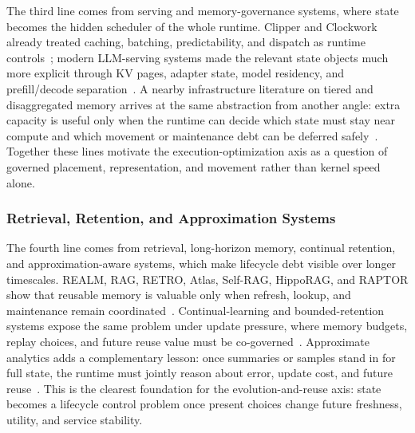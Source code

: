 \documentclass[acmsmall,screen,review]{acmart}
\begin{document}
The third line comes from serving and memory-governance systems, where state becomes the hidden scheduler of the whole runtime. Clipper and Clockwork already treated caching, batching, predictability, and dispatch as runtime controls~\cite{crankshaw2017clipper,gujarati2020clockwork}; modern LLM-serving systems made the relevant state objects much more explicit through KV pages, adapter state, model residency, and prefill/decode separation~\cite{shen2019nexus,crankshaw2020inferline,romero2021infaas,yu2022orca,sheng2023flexgen,li2023alpaserve,chen2024punica,kwon2023pagedattention,sheng2023slora,zheng2023sglang,agrawal2024sarathi,zhong2024distserve,patel2024splitwise,holmes2024fastgen,yu2025prism,zhang2025jenga}. A nearby infrastructure literature on tiered and disaggregated memory arrives at the same abstraction from another angle: extra capacity is useful only when the runtime can decide which state must stay near compute and which movement or maintenance debt can be deferred safely~\cite{hu2024aceso,zhong2024unimem,jalalian2024extmem,raybuck2021hemem,cho2024coaxial,zhao2025equilibria,peng2024scalacache,wang2025finemem,chang2024gmt,li2024streamcache,qiu2025hotrap}. Together these lines motivate the execution-optimization axis as a question of governed placement, representation, and movement rather than kernel speed alone.

\subsubsection{Retrieval, Retention, and Approximation Systems}

The fourth line comes from retrieval, long-horizon memory, continual retention, and approximation-aware systems, which make lifecycle debt visible over longer timescales. REALM, RAG, RETRO, Atlas, Self-RAG, HippoRAG, and RAPTOR show that reusable memory is valuable only when refresh, lookup, and maintenance remain coordinated~\cite{guu2020realm,lewis2020rag,borgeaud2022retro,izacard2022atlas,asai2024selfrag,wang2024hipporag,sarthi2024raptor}. Continual-learning and bounded-retention systems expose the same problem under update pressure, where memory budgets, replay choices, and future reuse value must be co-governed~\cite{kirkpatrick2017ewc,lopez2017gem,rebuffi2017icarl,chaudhry2019agem,rolnick2019experience,aljundi2019mir,buzzega2020der,hayes2020remind,prabhu2020gdumb,delange2021survey}. Approximate analytics adds a complementary lesson: once summaries or samples stand in for full state, the runtime must jointly reason about error, update cost, and future reuse~\cite{agarwal2013blinkdb,goiri2015approxhadoop,wang2018approxjoin,hu2018streamapprox,chen2018incapprox}. This is the clearest foundation for the evolution-and-reuse axis: state becomes a lifecycle control problem once present choices change future freshness, utility, and service stability.
\end{document}
